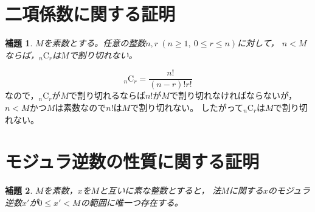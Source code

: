 \documentclass{article}
\makeatletter
\renewenvironment{proof}[1][\proofname]{\par
        \pushQED{\qed}
        \normalfont
        \topsep6\p@\@plus6\p@ \trivlist
        \item[\hskip\labelsep{\bfseries #1}\@addpunct{\bfseries}]\ignorespaces
    }{%
        \popQED\endtrivlist\@endpefalse
    }
\renewcommand{\proofname}{証明.}
\newtheorem{lemma}{補題}
\newcommand{\combination}[2]{{}_{#1} \mathrm{C}_{#2}}
\makeatother
\begin{document}
\section{二項係数に関する証明}

\begin{screen}
    \begin{lemma}
        \label{lemma:c:1}
        $M$を素数とする。任意の整数$n, r\ (n \geq 1,\ 0 \leq r \leq n)$に対して，
        $n < M$ならば，$\combination{n}{r}$は$M$で割り切れない。
    \end{lemma}
\end{screen}

\begin{proof}
    \begin{equation}
        \combination{n}{r} = \frac{n!}{(n - r)! r!}
    \end{equation}
    なので，$\combination{n}{r}$が$M$で割り切れるならば$n!$が$M$で割り切れなければならないが，
    $n < M$かつ$M$は素数なので$n!$は$M$で割り切れない。
    したがって$\combination{n}{r}$は$M$で割り切れない。
\end{proof}


\section{モジュラ逆数の性質に関する証明}

\begin{screen}
    \begin{lemma}
        \label{lemma:inv:1}
        $M$を素数，$x$を$M$と互いに素な整数とすると，
        法$M$に関する$x$のモジュラ逆数$x'$が$0 \leq x' < M$の範囲に唯一つ存在する。
    \end{lemma}
\end{screen}
\end{document}
